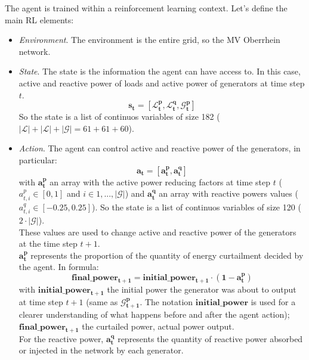 The agent is trained within a reinforcement learning context. Let's define the main \gls{RL} elements:
\begin{itemize}
    \item \emph{Environment}. The environment is the entire grid, so the MV Oberrhein network.
    
    \item \emph{State}. The state is the information the agent can have access to. In this case, active and reactive power of loads and active power of generators at time step $t$. \\
    \[
        \mathbf{s_t} = [\mathbf{\mathcal{L}^p_{t}},                             \mathbf{\mathcal{L}^q_{t}},                             \mathbf{\mathcal{G}^p_{t}}]
    \]
    \noindent So the state is a list of continuos variables of size 182 ($|\mathcal{L}|+|\mathcal{L}|+|\mathcal{G}| = 61 + 61 + 60$).

    \item \emph{Action}. The agent can control active and reactive power of the generators, in particular:
    \[
        \mathbf{a_t} = [\mathbf{a^p_t}, \mathbf{a^q_t}]
    \]
    with $\mathbf{a^p_t}$ an array with the active power reducing factors at time step $t$ ($a^p_{t,i} \in [0,1]$ and $i \in {1, ..., |\mathcal{G}|}$) and $\mathbf{a^q_t}$ an array with reactive powers values ($a^q_{t,i} \in [-0.25,0.25]$). So the state is a list of continuos variables of size 120 ($2 \cdot |\mathcal{G}|$).\\
    
    These values are used to change active and reactive power of the generators at the time step $t+1$.\\
    $\mathbf{a^p_t}$ represents the proportion of the quantity of energy curtailment decided by the agent. In formula:
    \[
        \mathbf{final\_power_{t+1}} = \mathbf{initial\_power_{t+1}} \cdot (\mathbf{1}-\mathbf{a^p_t})
    \]
    \noindent with $\mathbf{initial\_power_{t+1}}$ the initial power the generator was about to output at time step ${t+1}$ (same as $\mathbf{\mathcal{G}^p_{t+1}}$. The notation $\mathbf{initial\_power}$ is used for a clearer understanding of what happens before and after the agent action); $\mathbf{final\_power_{t+1}}$ the curtailed power, actual power output.\\
    
    For the reactive power, $\mathbf{a^q_t}$ represents the quantity of reactive power absorbed or injected in the network by each generator. 
    

\end{itemize}
